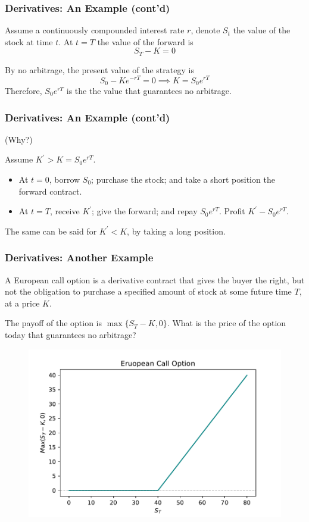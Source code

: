\documentclass{beamer}
\begin{document}
\begin{frame}
\frametitle{Derivatives: An Example (cont'd)}
Assume a continuously compounded interest rate $r$, denote $S_t$ the value of the stock at time $t$. At $t=T$ the value of the forward is
$$
	S_T - K = 0
$$

By no arbitrage, the present value of the strategy is
$$
	S_0 - Ke^{-rT} = 0 \implies K = S_0e^{rT}
$$
Therefore, $S_0e^{rT}$ is the the value that guarantees no arbitrage.
\end{frame}

\begin{frame}
\frametitle{Derivatives: An Example (cont'd)}

(Why?)

Assume $K^\prime > K = S_0e^{rT}$. 
\begin{itemize}
	\item At $t=0$, borrow $S_0$; purchase the stock; and take a short position the forward contract.
	\item At $t=T$, receive $K^\prime$; give the forward; and repay $S_0e^{rT}$. Profit $K^\prime - S_0e^{rT}$.
\end{itemize}

The same can be said for $K^\prime < K$, by taking a long position.
\end{frame}

\begin{frame}
\frametitle{Derivatives: Another Example}

\begin{definition}
A European call option is a derivative contract that gives the buyer the right, but not the obligation to purchase a specified amount of stock at some future time $T$, at a price $K$.
\end{definition}

The payoff of the option is $\max\{S_T - K, 0\}$. What is the price of the option today that guarantees no arbitrage?

\begin{figure}
	\includegraphics[width=0.45\textwidth=]{../images/Call}
\end{figure}
\end{frame}
\end{document}
